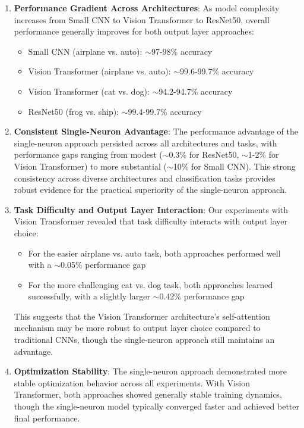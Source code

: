 \documentclass[11pt]{article}
\begin{document}
\begin{enumerate}
\item \textbf{Performance Gradient Across Architectures}: As model complexity increases from Small CNN to Vision Transformer to ResNet50, overall performance generally improves for both output layer approaches:
  \begin{itemize}
  \item Small CNN (airplane vs. auto): $\sim$97-98\% accuracy
  \item Vision Transformer (airplane vs. auto): $\sim$99.6-99.7\% accuracy
  \item Vision Transformer (cat vs. dog): $\sim$94.2-94.7\% accuracy
  \item ResNet50 (frog vs. ship): $\sim$99.4-99.7\% accuracy
  \end{itemize}

\item \textbf{Consistent Single-Neuron Advantage}: The performance advantage of the single-neuron approach persisted across all architectures and tasks, with performance gaps ranging from modest ($\sim$0.3\% for ResNet50, $\sim$1-2\% for Vision Transformer) to more substantial ($\sim$10\% for Small CNN). This strong consistency across diverse architectures and classification tasks provides robust evidence for the practical superiority of the single-neuron approach.

\item \textbf{Task Difficulty and Output Layer Interaction}: Our experiments with Vision Transformer revealed that task difficulty interacts with output layer choice:
  \begin{itemize}
  \item For the easier airplane vs. auto task, both approaches performed well with a $\sim$0.05\% performance gap
  \item For the more challenging cat vs. dog task, both approaches learned successfully, with a slightly larger $\sim$0.42\% performance gap
  \end{itemize}
  
  This suggests that the Vision Transformer architecture's self-attention mechanism may be more robust to output layer choice compared to traditional CNNs, though the single-neuron approach still maintains an advantage.

\item \textbf{Optimization Stability}: The single-neuron approach demonstrated more stable optimization behavior across all experiments. With Vision Transformer, both approaches showed generally stable training dynamics, though the single-neuron model typically converged faster and achieved better final performance.


\end{enumerate}
\end{document}
